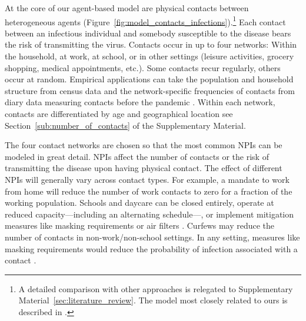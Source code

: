 At the core of our agent-based model are physical contacts between heterogeneous agents
(Figure~\ref{fig:model_contacts_infections}).\footnote{A detailed comparison with other
approaches  is relegated to Supplementary Material~\ref{sec:literature_review}. The
model most closely related to ours is described in \citet{Hinch2020}.} Each contact
between an infectious individual and somebody susceptible to the disease bears the risk
of transmitting the virus. Contacts occur in up to four networks: Within the household,
at work, at school, or in other settings (leisure activities, grocery shopping, medical
appointments, etc.). Some contacts recur regularly, others occur at random. Empirical
applications can take the population and household structure from census data and the
network-specific frequencies of contacts from diary data measuring contacts before the
pandemic \citep[e.g.][]{Mossong2008,Hoang2019}. Within each network, contacts are
differentiated by age and geographical location see Section~\ref{sub:number_of_contacts}
of the Supplementary Material.

The four contact networks are chosen so that the most common NPIs can be modeled in
great detail. NPIs affect the number of contacts or the risk of transmitting the disease
upon having physical contact. The effect of different NPIs will generally vary across
contact types. For example, a mandate to work from home will reduce the number of work
contacts to zero for a fraction of the working population. Schools and daycare can be
closed entirely, operate at reduced capacity---including an alternating schedule---, or
implement mitigation measures like masking requirements or air filters
\citep{Lessler2021}. Curfews may reduce the number of contacts in non-work/non-school
settings. In any setting, measures like masking requirements would reduce the
probability of infection associated with a contact \citep{Cheng2021}.

